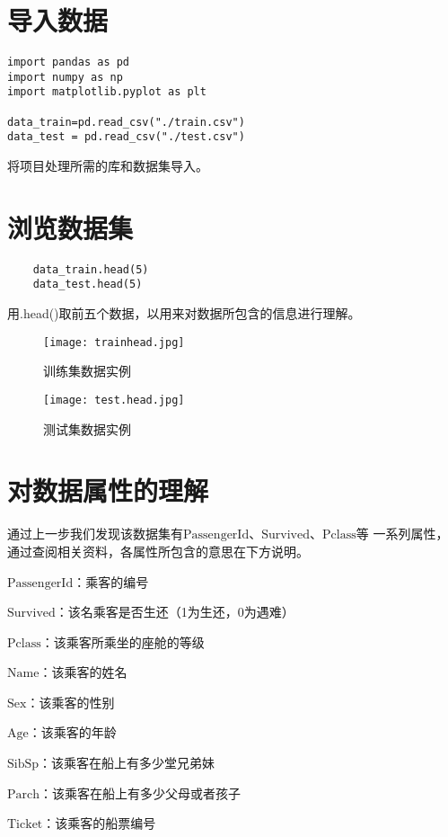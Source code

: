 \documentclass[AutoFakeBold]{LZUThesis}
\begin{document}
\section{导入数据}

\begin{lstlisting}
import pandas as pd
import numpy as np
import matplotlib.pyplot as plt

data_train=pd.read_csv("./train.csv")
data_test = pd.read_csv("./test.csv")

\end{lstlisting}
将项目处理所需的库和数据集导入。

\section{浏览数据集}

\begin{lstlisting}
    data_train.head(5)
    data_test.head(5)
\end{lstlisting}
用.head()取前五个数据，以用来对数据所包含的信息进行理解。
\begin{figure}[htbp]
    \centering
    \texttt{[image: trainhead.jpg]}
    \caption{训练集数据实例}
\end{figure}
\begin{figure}[htbp]
    \centering
    \texttt{[image: test.head.jpg]}
    \caption{测试集数据实例}
\end{figure}
\section{对数据属性的理解}
通过上一步我们发现该数据集有$\mathrm{PassengerId}$、$\mathrm{Survived}$、$\mathrm{Pclass}$等
一系列属性，通过查阅相关资料，各属性所包含的意思在下方说明。

$\mathrm{PassengerId}$：乘客的编号

$\mathrm{Survived}$：该名乘客是否生还（1为生还，0为遇难）

$\mathrm{Pclass}$：该乘客所乘坐的座舱的等级

$\mathrm{Name}$：该乘客的姓名

$\mathrm{Sex}$：该乘客的性别

$\mathrm{Age}$：该乘客的年龄

$\mathrm{SibSp}$：该乘客在船上有多少堂兄弟妹

$\mathrm{Parch}$：该乘客在船上有多少父母或者孩子

$\mathrm{Ticket}$：该乘客的船票编号
\end{document}
